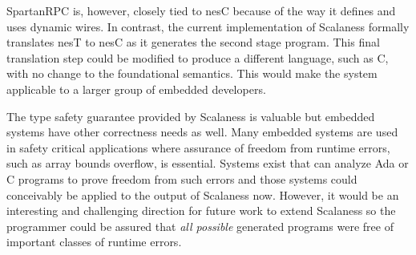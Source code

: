 SpartanRPC is, however, closely tied to nesC because of the way it defines and uses dynamic
wires. In contrast, the current implementation of Scalaness formally translates nesT to nesC as
it generates the second stage program. This final translation step could be modified to produce
a different language, such as C, with no change to the foundational semantics. This would make
the system applicable to a larger group of embedded developers.

The type safety guarantee provided by Scalaness is valuable but embedded systems have other
correctness needs as well. Many embedded systems are used in safety critical applications where
assurance of freedom from runtime errors, such as array bounds overflow, is essential. Systems
exist that can analyze Ada or C programs to prove freedom from such errors
\cite{Barnes:2000:SWC:369264.369271,Cuoq:2012:FSA:2404232.2404250} and those systems could
conceivably be applied to the output of Scalaness now. However, it would be an interesting and
challenging direction for future work to extend Scalaness so the programmer could be assured
that \emph{all possible} generated programs were free of important classes of runtime errors.

